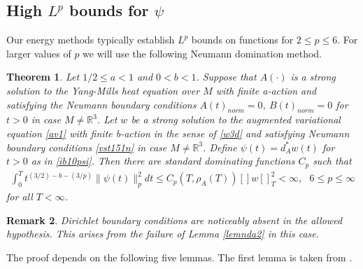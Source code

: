 \documentclass[12pt]{article}
\newtheorem{theorem}{Theorem}[section]
\newtheorem{remark}[theorem]{Remark}
\def \R{\mathbb R}
\def \nn{[]}
\def \eref{\eqref}
\numberwithin{equation}{section}
\begin{document}
   

\subsection{High $L^p$ bounds for $\psi$}           \label{sechighp}

Our energy methods typically establish $L^p$ bounds on functions for $ 2 \le p \le 6$.
For larger values of $p$ we will use the following Neumann domination method.

\begin{theorem}\label{thmpw1}  
 Let  $1/2 \le a <1$ and $0 < b <1$.  
Suppose that $A(\cdot)$ is a strong solution to the Yang-Mills
 heat equation over $M$ with finite a-action and satisfying the Neumann boundary conditions
 $A(t)_{norm}=0$, $B(t)_{norm} =0$  for $t >0$  in case $M \ne \R^3$.   
 Let $w$    be a strong solution
 to the augmented variational equation \eref{av1}  with  finite b-action in the sense of \eref{w3d}  
 and satisfying Neumann 
 boundary conditions  \eref{vst151n}    
 in case $M \ne \R^3$. 
 Define $\psi(t) = d_A^* w(t)$ for $t >0$  as in \eref{ib10psi}. Then there are   standard dominating 
  functions $C_p$ such that
\begin{align}
\int_0^T t^{(3/2) - b -(3/p)} \|\psi(t)\|_p^2 dt 
 \le C_p(T, \rho_A(T) )  \nn w\nn_T^2     <\infty,  \ \ \ 6 \le p \le  \infty  \label{ib200p}
\end{align}
for all $T < \infty$.
\end{theorem}

\begin{remark}{\rm Dirichlet boundary conditions are noticeably absent in the allowed hypothesis.
This arises from the failure of Lemma \ref{lemnda2} in this case.
}
\end{remark}

The proof depends on the following five lemmas. The first lemma is taken from \cite{G70}.
\end{document}
